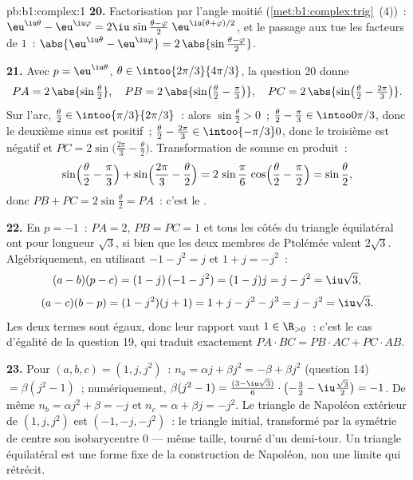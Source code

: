 \begin{solution}{pb:b1:complex:1}
\textbf{20.} Factorisation par l'angle moitié
(\cref{met:b1:complex:trig}~(4))~:
$\eu^{\iu\theta} - \eu^{\iu\varphi} = 2\iu\,\sin\frac{\theta -
\varphi}2\;\eu^{\iu(\theta + \varphi)/2}$, et le passage aux 
tue les facteurs de  $1$~: $\abs{\eu^{\iu\theta} -
\eu^{\iu\varphi}} = 2\,\abs{\sin\frac{\theta - \varphi}2}$.

\textbf{21.} Avec $p = \eu^{\iu\theta}$, $\theta \in
\intoo{2\pi/3}{4\pi/3}$, la question 20 donne
\[
PA = 2\,\abs{\sin\tfrac\theta2},
\quad
PB = 2\,\abs{\sin\bigl(\tfrac\theta2 - \tfrac\pi3\bigr)},
\quad
PC = 2\,\abs{\sin\bigl(\tfrac\theta2 - \tfrac{2\pi}3\bigr)} .
\]
Sur l'arc, $\frac\theta2 \in \intoo{\pi/3}{2\pi/3}$~: alors
$\sin\frac\theta2 > 0$~; $\frac\theta2 - \frac\pi3 \in
\intoo0{\pi/3}$, donc le deuxième sinus est positif~; $\frac\theta2
- \frac{2\pi}3 \in \intoo{-\pi/3}0$, donc le troisième est négatif
et $PC = 2\sin\bigl(\frac{2\pi}3 - \frac\theta2\bigr)$.
Transformation de somme en produit~:
\[
\sin\Bigl(\frac\theta2 - \frac\pi3\Bigr) +
\sin\Bigl(\frac{2\pi}3 - \frac\theta2\Bigr)
= 2\,\sin\frac\pi6\,\cos\Bigl(\frac\theta2 - \frac\pi2\Bigr)
= \sin\frac\theta2 ,
\]
donc $PB + PC = 2\sin\frac\theta2 = PA$~: c'est le .

\textbf{22.} En $p = -1$~: $PA = 2$, $PB = PC = 1$ et tous les côtés
du triangle équilatéral ont pour longueur $\sqrt3$, si bien que les
deux membres de Ptolémée valent $2\sqrt3$. Algébriquement, en
utilisant $-1 - j^2 = j$ et $1 + j = -j^2$~:
\[
(a - b)(p - c) = (1 - j)\,(-1 - j^2) = (1 - j)j = j - j^2
= \iu\sqrt3 ,
\]
\[
(a - c)(b - p) = (1 - j^2)(j + 1) = 1 + j - j^2 - j^3
= j - j^2 = \iu\sqrt3 .
\]
Les deux termes sont égaux, donc leur rapport vaut $1 \in
\R_{>0}$~: c'est le cas d'égalité de la question 19, qui traduit
exactement $PA \cdot BC = PB \cdot AC + PC \cdot AB$.

\textbf{23.} Pour $(a, b, c) = (1, j, j^2)$~: $n_a = \alpha j +
\beta j^2 = -\beta + \beta j^2$ (question 14) $= \beta(j^2 - 1)$~;
numériquement, $\beta(j^2 - 1) = \frac{(3 - \iu\sqrt3)}6 \cdot
\bigl(-\frac32 - \iu\frac{\sqrt3}2\bigr) = -1$. De même $n_b =
\alpha j^2 + \beta = -j$ et $n_c = \alpha + \beta j = -j^2$. Le
triangle de Napoléon extérieur de $(1, j, j^2)$ est $(-1, -j,
-j^2)$~: le triangle initial, transformé par la symétrie de centre
son isobarycentre $0$ --- même taille, tourné d'un demi-tour. Un
triangle équilatéral est une forme fixe de la construction de
Napoléon, non une limite qui rétrécit.


\end{solution}
